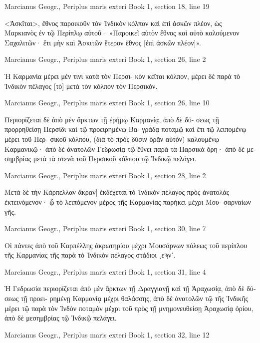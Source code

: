 \documentclass[12pt,letterpaper,twoside,final]{memoir}
\begin{document}
\begin{greek}
Marcianus Geogr., Periplus maris exteri 
Book 1, section 18, line 19

<Ἀσκῖται>, ἔθνος παροικοῦν τὸν Ἰνδικὸν κόλπον καὶ   
ἐπὶ ἀσκῶν πλέον, ὡς Μαρκιανὸς ἐν τῷ Περίπλῳ αὐτοῦ· 
»Παροικεῖ αὐτὸν ἔθνος καὶ αὐτὸ καλούμενον Σαχαλιτῶν· 
ἔτι μὴν καὶ Ἀσκιτῶν ἕτερον ἔθνος [ἐπὶ ἀσκῶν πλέον]». 



Marcianus Geogr., Periplus maris exteri 
Book 1, section 26, line 2

Ἡ Καρμανία μέρει μέν τινι κατὰ τὸν Περσι-
κὸν κεῖται κόλπον, μέρει δὲ παρὰ τὸ Ἰνδικὸν πέλαγος 
[τὸ] μετὰ τὸν κόλπον τὸν Περσικόν. 



Marcianus Geogr., Periplus maris exteri 
Book 1, section 26, line 10

                                          Περιορίζεται   
δὲ ἀπὸ μὲν ἄρκτων τῇ ἐρήμῳ Καρμανίᾳ, ἀπὸ δὲ δύ-
σεως τῇ προρρηθείσῃ Περσίδι καὶ τῷ προειρημένῳ Βα-
γράδᾳ ποταμῷ καὶ ἔτι τῷ λειπομένῳ μέρει τοῦ Περ-
σικοῦ κόλπου, (διὰ τὸ πρὸς δύσιν ὁρᾶν αὐτὸν) καλουμένῳ 
Καρμανικῷ· ἀπὸ δὲ ἀνατολῶν Γεδρωσίᾳ τῷ ἔθνει παρὰ 
τὰ Παρσικὰ ὄρη· ἀπὸ δὲ μεσημβρίας μετὰ τὰ στενὰ 
τοῦ Περσικοῦ κόλπου τῷ Ἰνδικῷ πελάγει. 



Marcianus Geogr., Periplus maris exteri 
Book 1, section 28, line 2

Μετὰ δὲ τὴν Κάρπελλαν ἄκραν] ἐκδέχεται 
τὸ Ἰνδικὸν πέλαγος πρὸς ἀνατολὰς ἐκτεινόμενον· ᾧ τὸ 
λειπόμενον μέρος τῆς Καρμανίας παρήκει μέχρι Μου-
σαρναίων γῆς. 



Marcianus Geogr., Periplus maris exteri 
Book 1, section 30, line 7

                    Οἱ πάντες ἀπὸ τοῦ Καρπέλλης 
ἀκρωτηρίου μέχρι Μουσάρνων πόλεως τοῦ περίπλου 
τῆς Καρμανίας τῆς παρὰ τὸ Ἰνδικὸν πέλαγος στάδιοι 
͵εϡνʹ. 



Marcianus Geogr., Periplus maris exteri 
Book 1, section 31, line 4

Ἡ Γεδρωσία περιορίζεται ἀπὸ μὲν ἄρκτων τῇ 
Δραγγιανῇ καὶ τῇ Ἀραχωσίᾳ, ἀπὸ δὲ δύσεως τῇ προει-
ρημένῃ Καρμανίᾳ μέχρι θαλάσσης, ἀπὸ δὲ ἀνατολῶν τῷ 
τῆς Ἰνδικῆς μέρει τῷ παρὰ τὸν Ἰνδὸν ποταμὸν μέχρι 
τοῦ πρὸς τῇ μνημονευθείσῃ Ἀραχωσίᾳ ὁρίου, ἀπὸ δὲ 
μεσημβρίας τῷ Ἰνδικῷ πελάγει. 



Marcianus Geogr., Periplus maris exteri 
Book 1, section 32, line 12


\end{greek}
\end{document}

